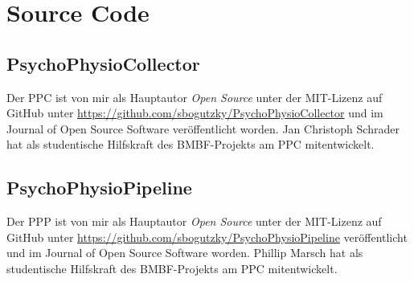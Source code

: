 

\chapter{Source Code} 
\section{PsychoPhysioCollector} Der \ac{PPC} ist von mir als Hauptautor \emph{Open Source} unter der MIT-Lizenz auf GitHub unter \url{https://github.com/sbogutzky/PsychoPhysioCollector} und im Journal of Open Source Software \citep{Bogutzky2016} veröffentlicht worden. Jan Christoph Schrader hat als studentische Hilfskraft des \acs{BMBF}-Projekts am \ac{PPC} mitentwickelt. 

\section{PsychoPhysioPipeline} Der \ac{PPP} ist von mir als Hauptautor \emph{Open Source} unter der MIT-Lizenz auf GitHub unter \url{https://github.com/sbogutzky/PsychoPhysioPipeline} veröffentlicht und im Journal of Open Source Software \citep{Bogutzky2016a} worden. Phillip Marsch hat als studentische Hilfskraft des \acs{BMBF}-Projekts am \ac{PPC} mitentwickelt. 
